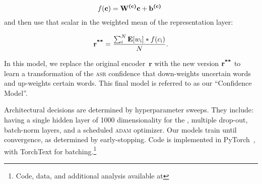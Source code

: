 \begin{equation}
f(\textbf{c}) = \textbf{W\textsuperscript{(c)}c} + \textbf{b\textsuperscript{(c)} }
\end{equation}
and then use that scalar in the weighted mean of the 
representation layer:

\begin{equation}
\textbf{r\textsuperscript{**}} = \frac{\sum_{i}^{N} \textbf{E}[w\textsubscript{i}] * f(c\textsubscript{i})}{N}.
\end{equation}

In this model, we replace the original encoder~$\textbf{r}$ with the
new version $\textbf{r\textsuperscript{**}}$ to learn a transformation
of the \textsc{asr} confidence that down-weights uncertain words and
up-weights certain words.  This final model is referred to as our ``Confidence Model''.

Architectural decisions are determined by hyperparameter sweeps.  They include: having a single hidden layer of 1000 dimensionality for the \dan, multiple drop-out, batch-norm layers, and a scheduled \textsc{adam} optimizer. Our \dan{} models train until convergence, as determined by early-stopping.  Code is
implemented in PyTorch~\cite{paszke2017automatic}, with TorchText for
batching.\footnote{Code, data, and additional analysis available at }



















